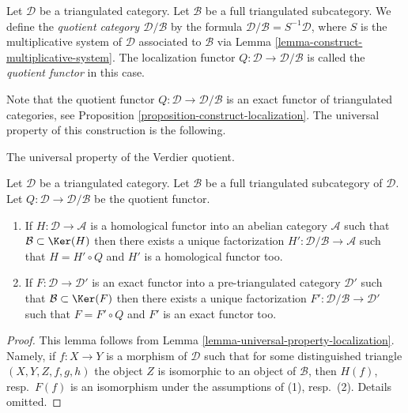 \begin{definition}
\label{definition-quotient-category}
Let $\mathcal{D}$ be a triangulated category.
Let $\mathcal{B}$ be a full triangulated subcategory.
We define the {\it quotient category $\mathcal{D}/\mathcal{B}$}
by the formula $\mathcal{D}/\mathcal{B} = S^{-1}\mathcal{D}$, where
$S$ is the multiplicative system of $\mathcal{D}$ associated to
$\mathcal{B}$ via
Lemma \ref{lemma-construct-multiplicative-system}.
The localization functor $Q : \mathcal{D} \to \mathcal{D}/\mathcal{B}$
is called the {\it quotient functor} in this case.
\end{definition}

\noindent
Note that the quotient functor
$Q : \mathcal{D} \to \mathcal{D}/\mathcal{B}$
is an exact functor of triangulated categories, see
Proposition \ref{proposition-construct-localization}.
The universal property of this construction is the following.

\begin{lemma}
\label{lemma-universal-property-quotient}
\begin{slogan}
The universal property of the Verdier quotient.
\end{slogan}
Let $\mathcal{D}$ be a triangulated category. Let $\mathcal{B}$
be a full triangulated subcategory of $\mathcal{D}$. Let
$Q : \mathcal{D} \to \mathcal{D}/\mathcal{B}$ be the quotient functor.
\begin{enumerate}
\item If $H : \mathcal{D} \to \mathcal{A}$ is a homological functor into
an abelian category $\mathcal{A}$ such that
$\mathcal{B} \subset \Ker(H)$ then there exists a unique factorization
$H' : \mathcal{D}/\mathcal{B} \to \mathcal{A}$ such that $H = H' \circ Q$
and $H'$ is a homological functor too.
\item If $F : \mathcal{D} \to \mathcal{D}'$ is an exact functor into
a pre-triangulated category $\mathcal{D}'$ such that
$\mathcal{B} \subset \Ker(F)$ then there exists a unique factorization
$F' : \mathcal{D}/\mathcal{B} \to \mathcal{D}'$ such that $F = F' \circ Q$
and $F'$ is an exact functor too.
\end{enumerate}
\end{lemma}

\begin{proof}
This lemma follows from
Lemma \ref{lemma-universal-property-localization}.
Namely, if $f : X \to Y$ is a morphism of $\mathcal{D}$
such that for some distinguished triangle $(X, Y, Z, f, g, h)$
the object $Z$ is isomorphic to an object of $\mathcal{B}$, then
$H(f)$, resp.\ $F(f)$ is an isomorphism under the assumptions of
(1), resp.\ (2). Details omitted.
\end{proof}


